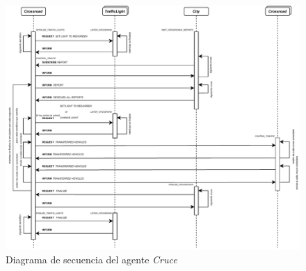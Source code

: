 \begin{figure}[H]
    \centering
    \includegraphics[width=1\linewidth]{text/image/DAgen-DS-Crossroad.pdf}
    \caption{Diagrama de secuencia del agente \textit{Cruce}}
    \label{fig:ds_agente_cruce}
\end{figure}

\newpage
